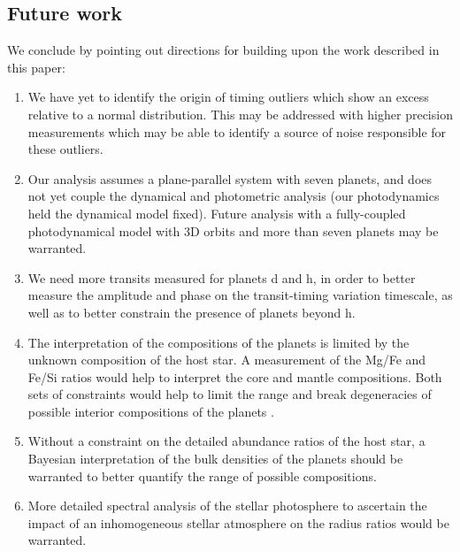 \documentclass[twocolumn]{aastex63}
\begin{document}

\subsection{Future work}

We conclude by pointing out directions for building upon the work described in this paper:
\begin{enumerate}
    \item We have yet to identify the origin of timing outliers which
          show an excess relative to a normal distribution.  This may be addressed
          with higher precision measurements which may be able to identify a source
          of noise responsible for these outliers.
    \item Our analysis assumes a plane-parallel system with seven planets, and
          does not yet couple the dynamical and photometric analysis (our photodynamics
          held the dynamical model fixed).  Future analysis with a fully-coupled
          photodynamical model with 3D orbits and more than seven planets may be warranted.
    \item We need more transits measured for planets d and h, in order
          to better measure the amplitude and phase on the transit-timing variation
          timescale, as well as to better constrain the presence of planets beyond h.
    \item The interpretation of the compositions of the planets is limited by the unknown composition of the host star. A measurement of the Mg/Fe and Fe/Si ratios would help to interpret the core and mantle compositions.  Both sets of constraints would help to limit the range and break degeneracies of possible interior compositions of the planets \citep{Dorn2015,Bitsch2019b}.
    \item Without a constraint on the detailed abundance ratios of the host star, a Bayesian interpretation of the bulk densities of the planets should be warranted \citep{Dorn2016} to better quantify the range of possible compositions.
    \item More detailed spectral analysis of the stellar photosphere to ascertain the impact of an inhomogeneous stellar atmosphere on the radius ratios would be warranted.
\end{enumerate}
\end{document}
